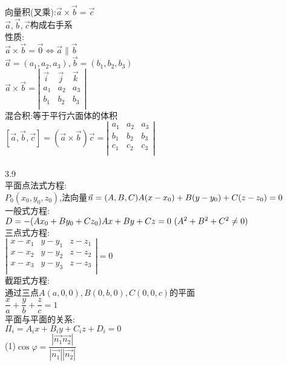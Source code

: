 \documentclass[11pt, a4paper, UTF8]{ctexart}
\begin{document}
\indent\\
向量积(叉乘):$ \vec{a}\times\vec{b}=\vec{c} $\\
$ \vec{a},\vec{b},\vec{c} $构成右手系\\
性质:\\
$ \vec{a}\times\vec{b}=\vec{0}\Leftrightarrow\vec{a}\parallel\vec{b} $\\
$ \vec{a}=(a_1,a_2,a_3),\vec{b}=(b_1,b_2,b_3) $\\
$
\vec{a}\times\vec{b}=
\left| %
\begin{array}{lcr}
\vec{i}&\vec{j}&\vec{k}\\
a_1&a_2&a_3\\
b_1&b_2&b_3\\
\end{array}
\right|
$\\
混合积:等于平行六面体的体积\\
$
[\vec{a},\vec{b},\vec{c}]=(\vec{a}\times\vec{b})\vec{c}=
\left|\begin{array}{lcr}
a_1&a_2&a_3\\
b_1&b_2&b_3\\
c_1&c_2&c_3\\
\end{array}\right|
$\\
\\
3.9\\
平面点法式方程:\\
$ P_0(x_0,y_0,z_0) $,法向量$ \vec{n}=(A,B,C)\\
A(x-x_0)+B(y-y_0)+C(z-z_0)=0 $\\
一般式方程:\\
$ D=-(Ax_0+By_0+Cz_0)\\
Ax+By+Cz=0\ (A^2+B^2+C^2\not=0) $\\
三点式方程:\\
$
\left|\begin{array}{lcr}
x-x_1&y-y_1&z-z_1\\
x-x_2&y-y_2&z-z_2\\
x-x_3&y-y_3&z-z_3\\
\end{array}\right|=0
$\\
截距式方程:\\
通过三点$ A(a,0,0),B(0,b,0),C(0,0,c) $的平面\\
$ \dfrac{x}{a}+\dfrac{y}{b}+\dfrac{z}{c}=1 $\\
平面与平面的关系:\\
$ \Pi_i=A_ix+B_iy+C_iz+D_i=0 $\\
(1)$ \cos\varphi=\dfrac{|\overrightarrow{n_1}\overrightarrow{n_2}|}{|\overrightarrow{n_1}||\overrightarrow{n_2}|} $\\
\end{document}
